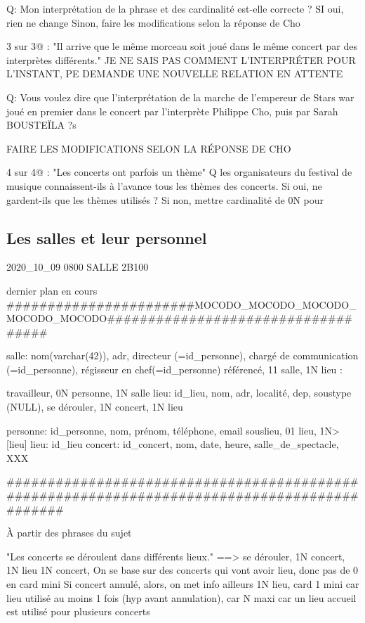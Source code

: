 \documentclass[12pt,a4paper]{article}
\begin{document}
{Q: Mon interprétation de la phrase et des cardinalité est-elle correcte ?
SI oui, rien ne change
Sinon, faire les modifications selon la réponse de Cho



3 sur 3@ : "Il arrive que le même morceau soit joué dans le même concert par des interprètes différents."
JE NE SAIS PAS COMMENT L'INTERPRÉTER POUR L'INSTANT, PE DEMANDE UNE NOUVELLE RELATION
EN ATTENTE

Q: Vous voulez dire que l'interprétation de la marche de l'empereur de Stars war joué en premier
dans le concert par l'interprète Philippe Cho, puis par Sarah BOUSTEÏLA ?s

FAIRE LES MODIFICATIONS SELON LA RÉPONSE DE CHO


4 sur 4@ : "Les concerts ont parfois un thème"
Q les organisateurs du festival de musique connaissent-ils à l'avance tous les thèmes des concerts.
Si oui, ne gardent-ils que les thèmes utilisés ?
Si non, mettre cardinalité de 0N pour 



\subsection{Les salles et leur personnel}
2020_10_09 0800 SALLE 2B100


dernier plan en cours
#######################MOCODO_MOCODO_MOCODO_MOCODO_MOCODO###################################

salle: nom(varchar(42)), adr, directeur (=id_personne), chargé de communication (=id_personne), régisseur en chef(=id_personne)
référencé, 11 salle, 1N lieu
:

travailleur, 0N personne, 1N salle
lieu: id_lieu, nom, adr, localité, dep, soustype (NULL),
se dérouler, 1N concert, 1N lieu

personne: id_personne, nom, prénom, téléphone, email
souslieu, 01 lieu,   1N> [lieu] lieu: id_lieu
concert: id_concert, nom, date, heure, salle_de_spectacle, XXX

#############################################################################################



À partir des phrases du sujet

"Les concerts se déroulent dans différents lieux."
==> se dérouler, 1N concert, 1N lieu
1N concert, On se base sur des concerts qui vont avoir lieu, donc pas de 0 en card mini
Si concert annulé, alors, on met info ailleurs
1N lieu, card 1 mini car lieu utilisé au moins 1 fois (hyp avant annulation),
car N maxi car un lieu accueil est utilisé pour plusieurs concerts 

}
\end{document}
